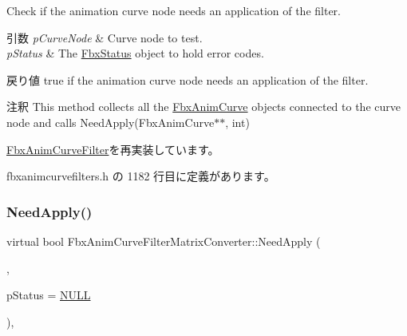 Check if the animation curve node needs an application of the filter. 
\begin{DoxyParams}{引数}
{\em p\+Curve\+Node} & Curve node to test. \\
\hline
{\em p\+Status} & The \hyperlink{class_fbx_status}{Fbx\+Status} object to hold error codes. \\
\hline
\end{DoxyParams}
\begin{DoxyReturn}{戻り値}
{\ttfamily true} if the animation curve node needs an application of the filter. 
\end{DoxyReturn}
\begin{DoxyRemark}{注釈}
This method collects all the \hyperlink{class_fbx_anim_curve}{Fbx\+Anim\+Curve} objects connected to the curve node and calls Need\+Apply(\+Fbx\+Anim\+Curve$\ast$$\ast$, int) 
\end{DoxyRemark}


\hyperlink{class_fbx_anim_curve_filter_a2a88d855d34bb1f2f22ca8386020b33a}{Fbx\+Anim\+Curve\+Filter}を再実装しています。



 fbxanimcurvefilters.\+h の 1182 行目に定義があります。

\mbox{\label{class_fbx_anim_curve_filter_matrix_converter_ad19ed98d377e10fb85c20454dbbadaae}} 
\subsubsection{\texorpdfstring{Need\+Apply()}{NeedApply()}\hspace{0.1cm}{\footnotesize\ttfamily [3/6]}}
{\footnotesize\ttfamily virtual bool Fbx\+Anim\+Curve\+Filter\+Matrix\+Converter\+::\+Need\+Apply (\begin{DoxyParamCaption}\item[{\hyperlink{class_fbx_anim_stack}{Fbx\+Anim\+Stack} $\ast$}]{,  }\item[{\hyperlink{class_fbx_status}{Fbx\+Status} $\ast$}]{p\+Status = {\ttfamily \hyperlink{fbxarch_8h_a070d2ce7b6bb7e5c05602aa8c308d0c4}{N\+U\+LL}} }\end{DoxyParamCaption})\hspace{0.3cm}{\ttfamily [inline]}, {\ttfamily [virtual]}}

